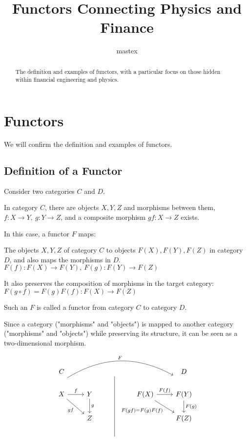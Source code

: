 \documentclass[uplatex,a4j,12pt,dvipdfmx]{jsarticle}
\title{
Functors Connecting Physics and Finance
}
\author{
mastex
}
\begin{document}
\maketitle

\begin{abstract}
	The definition and examples of functors, with a particular focus on those hidden within financial engineering and physics.
\end{abstract}


\section{Functors}

We will confirm the definition and examples of functors.

\subsection{Definition of a Functor}

Consider two categories $C$ and $D$.

In category $C$, there are objects $X,Y,Z$ and morphisms between them,
$f: X \to Y , \ g: Y \to Z$,
and a composite morphism
$gf: X \to  Z$
exists.

In this case, a functor $F$ maps:

The objects $X,Y,Z$ of category $C$ to objects $F(X),F(Y),F(Z)$ in category $D$,
and also maps the morphisms in $D$.
$F(f): F(X) \to F(Y) , \ F(g): F(Y) \to F(Z)$

It also preserves the composition of morphisms in the target category:
$F(g \circ f) = F(g) F(f): F(X) \to F(Z)$

Such an $F$ is called a functor from category $C$ to category $D$.

Since a category ("morphisms" and "objects") is mapped to another category ("morphisms" and "objects") while preserving its structure, it can be seen as a two-dimensional morphism.

\[
	\begin{tikzcd}
		C           &        & {}          &                  & D            \\
		X \arrow[r, "f"] \arrow[rd, "gf"'] \arrow[rrrr, "F", bend left, shift left=8] & Y \arrow[d, "g"] &         & F(X) \arrow[r, "F(f)"] \arrow[rd, "F(gf) = F(g)F(f)"'] & F(Y) \arrow[d, "F(g)"] \\
		& Z          &         &                                  & F(Z)         \\
		&            & {} \arrow[uuu, no head] &                                  &
	\end{tikzcd}
\]
\end{document}
